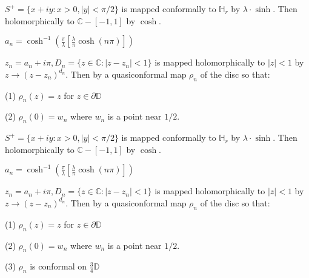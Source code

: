 \documentclass{beamer}
\begin{document}
\begin{frame} 

$S^+ = \{ x + iy : x > 0, |y| < \pi/2 \}$ is mapped conformally to $\mathbb{H}_r$ by $\lambda\cdot\sinh$. Then holomorphically to $\mathbb{C} - [-1,1]$ by $\cosh$.

\vspace{2.5mm}

$a_n = \cosh^{-1}\left( \frac{\pi}{\lambda} \left[ \frac{\lambda}{\pi} \cosh(n\pi) \right] \right)$

\vspace{2.5mm}

$z_n = a_n + i\pi, D_n = \{ z \in \mathbb{C} : \left| z - z_n \right| < 1\} $ is mapped holomorphically to $|z|<1$ by $z\rightarrow (z - z_n)^{d_n}$. Then by a quasiconformal map $\rho_n$ of the disc so that: 

\hspace{5mm} (1) $\rho_n(z)=z$ for $z\in\partial\mathbb{D}$

\hspace{5mm} (2) $\rho_n(0)=w_n$ where $w_n$ is a point near $1/2$.

\end{frame}




\begin{frame} 

$S^+ = \{ x + iy : x > 0, |y| < \pi/2 \}$ is mapped conformally to $\mathbb{H}_r$ by $\lambda\cdot\sinh$. Then holomorphically to $\mathbb{C} - [-1,1]$ by $\cosh$.

\vspace{2.5mm}

$a_n = \cosh^{-1}\left( \frac{\pi}{\lambda} \left[ \frac{\lambda}{\pi} \cosh(n\pi) \right] \right)$

\vspace{2.5mm}

$z_n = a_n + i\pi, D_n = \{ z \in \mathbb{C} : \left| z - z_n \right| < 1\} $ is mapped holomorphically to $|z|<1$ by $z\rightarrow (z - z_n)^{d_n}$. Then by a quasiconformal map $\rho_n$ of the disc so that: 

\hspace{5mm} (1) $\rho_n(z)=z$ for $z\in\partial\mathbb{D}$

\hspace{5mm} (2) $\rho_n(0)=w_n$ where $w_n$ is a point near $1/2$.

\hspace{5mm} (3) $\rho_n$ is conformal on $\frac{3}{4}\mathbb{D}$

\end{frame}
\end{document}
